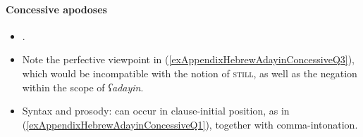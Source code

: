\paragraph{Concessive apodoses}\label{appendixHebrewAdayinConcessiveConsequent}
\begin{itemize}
	\item \textcite{TsirkinSadan2019}.
	\item Note the perfective viewpoint in (\ref{exAppendixHebrewAdayinConcessiveQ3}), which would be incompatible with the notion of \textsc{still}, as well as the negation within the scope of \textit{ʕadayin}.
	\item Syntax and prosody: can occur in clause-initial position, as in (\ref{exAppendixHebrewAdayinConcessiveQ1}), together with comma-intonation.
\end{itemize}


